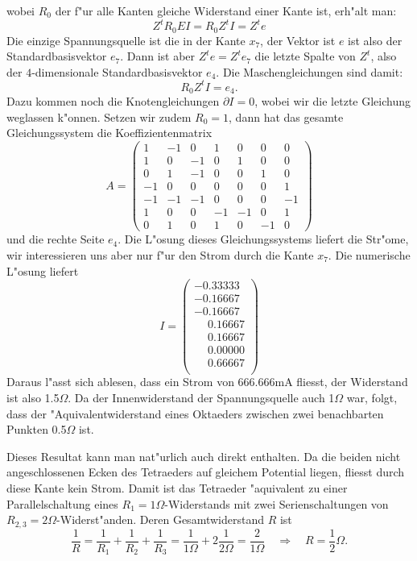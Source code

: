 \begin{loesung}
wobei $R_0$ der f"ur alle Kanten gleiche Widerstand einer Kante ist,
erh"alt man:
\[
Z^tR_0EI=R_0Z^tI=Z^te
\]
Die einzige Spannungsquelle ist die in der Kante $x_7$, der Vektor
ist $e$ ist also der Standardbasisvektor $e_7$. Dann ist aber
$Z^te=Z^te_7$ die letzte Spalte von $Z^t$, also der $4$-dimensionale
Standardbasisvektor $e_4$. Die Maschengleichungen sind damit:
\[
R_0Z^tI=e_4.
\]
Dazu kommen noch die Knotengleichungen $\partial I=0$, wobei wir die letzte
Gleichung weglassen k"onnen. Setzen wir zudem $R_0=1$, dann hat das
gesamte Gleichungssystem die Koeffizientenmatrix
\[
A=\begin{pmatrix}
 1&-1& 0& 1& 0& 0& 0\\
 1& 0&-1& 0& 1& 0& 0\\
 0& 1&-1& 0& 0& 1& 0\\
-1& 0& 0& 0& 0& 0& 1\\
-1&-1&-1& 0& 0& 0&-1\\
 1& 0& 0&-1&-1& 0& 1\\
 0& 1& 0& 1& 0&-1& 0
\end{pmatrix}
\]
%
%
und die rechte Seite $e_4$. Die L"osung dieses Gleichungssystems liefert die
Str"ome, wir interessieren uns aber nur f"ur den Strom durch die
Kante $x_7$. Die numerische L"osung liefert
\[
I=\begin{pmatrix}
          -0.33333\\
          -0.16667\\
          -0.16667\\
\phantom{-}0.16667\\
\phantom{-}0.16667\\
\phantom{-}0.00000\\
\phantom{-}0.66667\\
\end{pmatrix}
\]
Daraus l"asst sich ablesen, dass ein Strom von 666.666mA fliesst,
der Widerstand ist also 1.5$\Omega$. Da der Innenwiderstand
der Spannungsquelle auch 1$\Omega$ war, folgt, dass der "Aquivalentwiderstand
eines Oktaeders zwischen zwei benachbarten Punkten 0.5$\Omega$ ist.

Dieses Resultat kann man nat"urlich auch direkt enthalten. Da die beiden
nicht angeschlossenen Ecken des Tetraeders auf gleichem Potential liegen,
fliesst durch diese Kante kein Strom. Damit ist das Tetraeder "aquivalent
zu einer Parallelschaltung eines $R_1=1\Omega$-Widerstands mit zwei
Serienschaltungen von $R_{2,3}=2\Omega$-Widerst"anden.
Deren Gesamtwiderstand $R$
ist
\[
\frac1R=\frac1{R_1}+\frac1{R_2}+\frac1{R_3}=\frac1{1\Omega}+2\frac1{2\Omega}=\frac2{1\Omega}
\quad
\Rightarrow
\quad
R=\frac12\Omega.
\]
\end{loesung}

